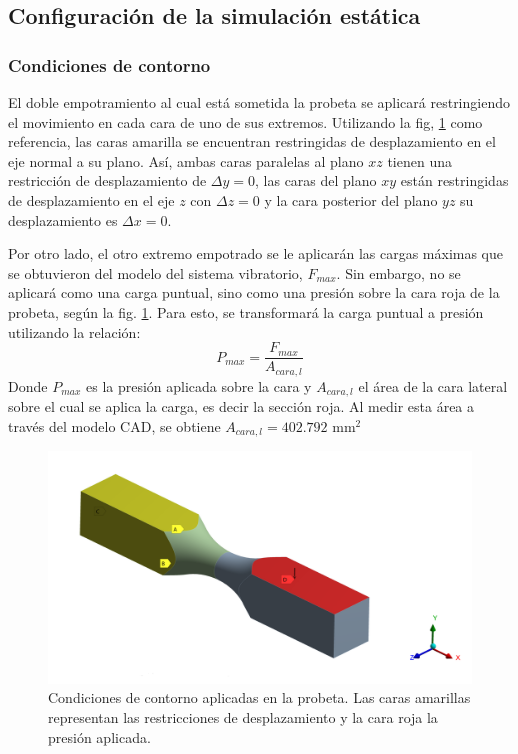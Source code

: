 \newpage

\subsection{Configuración de la simulación estática}
\subsubsection{Condiciones de contorno}
El doble empotramiento al cual está sometida la probeta se aplicará restringiendo el movimiento en cada cara de uno de sus extremos. Utilizando la fig, \ref{fig:cond_borde} como referencia, las caras amarilla se encuentran restringidas de desplazamiento en el eje normal a su plano. Así, ambas caras paralelas al plano $xz$ tienen una restricción de desplazamiento de $\Delta y = 0$, las caras del plano $xy$ están restringidas de desplazamiento en el eje $z$ con $\Delta z = 0$ y la cara posterior del plano $yz$ su desplazamiento es $\Delta x = 0$.

Por otro lado, el otro extremo empotrado se le aplicarán las cargas máximas que se obtuvieron del modelo del sistema vibratorio, $F_{max}$. Sin embargo, no se aplicará como una carga puntual, sino como una presión sobre la cara roja de la probeta, según la fig. \ref{fig:cond_borde}. Para esto, se transformará la carga puntual a presión utilizando la relación:
\begin{equation}\label{eq:p_max}
	P_{max} = \frac{F_{max}}{A_{cara,l}}
\end{equation}
Donde $P_{max}$ es la presión aplicada sobre la cara y $A_{cara,l}$ el área de la cara lateral sobre el cual se aplica la carga, es decir la sección roja. Al medir esta área a través del modelo CAD, se obtiene $A_{cara,l} = 402.792 \text{ mm}^2$

\begin{figure}[]
\centering
\includegraphics[width=0.7\linewidth]{Imagenes/cond_borde.png}
\caption{Condiciones de contorno aplicadas en la probeta. Las caras amarillas representan las restricciones de desplazamiento y la cara roja la presión aplicada.}
\label{fig:cond_borde}
\end{figure}


